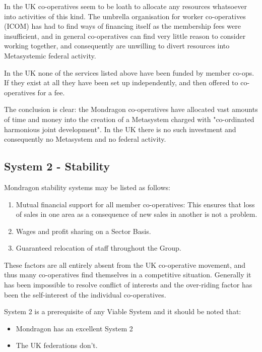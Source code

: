 In the UK co-operatives seem to be loath to allocate any resources whatsoever into activities of this kind. The umbrella organisation for worker co-operatives (ICOM) has had to find ways of financing itself as the membership fees were insufficient, and in general co-operatives can find very little reason to consider working together, and consequently are unwilling to divert resources into Metasystemic federal activity.

In the UK none of the services listed above have been funded by member co-ops. If they exist at all they have been set up independently, and then offered to co-operatives for a fee.

The conclusion is clear: the Mondragon co-operatives have allocated vast amounts of time and money into the creation of a Metasystem charged with "co-ordinated harmonious joint development". In the UK there is no such investment and consequently no Metasystem and no federal activity.

\subsection*{System 2 - Stability}
Mondragon stability systems may be listed as follows:

\begin{enumerate}
  \item Mutual financial support for all member co-operatives: This ensures that loss of sales in one area as a consequence of new sales in another is not a problem.

  \item Wages and profit sharing on a Sector Basis.

  \item Guaranteed relocation of staff throughout the Group.

\end{enumerate}

These factors are all entirely absent from the UK co-operative movement, and thus many co-operatives find themselves in a competitive situation. Generally it has been impossible to resolve conflict of interests and the over-riding factor has been the self-interest of the individual co-operatives.

System 2 is a prerequisite of any Viable System and it should be noted that:

\begin{itemize}
  \item Mondragon has an excellent System 2

  \item The UK federations don't.

\end{itemize}

